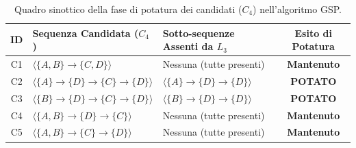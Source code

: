 \begin{table}[H]
\centering
\caption{Quadro sinottico della fase di potatura dei candidati ($C_4$) nell'algoritmo GSP.}
\label{tab:dm-gsp-pruning-summary}
\begin{tabularx}{\textwidth}{c l Y c}
\toprule
\textbf{ID} & \textbf{Sequenza Candidata ($C_4$)} & \textbf{Sotto-sequenze Assenti da $L_3$} & \textbf{Esito di Potatura} \\
\midrule
C1 & $\langle \{A, B\} \to \{C, D\} \rangle$                & Nessuna (tutte presenti) & \textbf{Mantenuto} \\
C2 & $\langle \{A\} \to \{D\} \to \{C\} \to \{D\} \rangle$  & $\langle \{A\} \to \{D\} \to \{D\} \rangle$ & \textbf{POTATO} \\
C3 & $\langle \{B\} \to \{D\} \to \{C\} \to \{D\} \rangle$  & $\langle \{B\} \to \{D\} \to \{D\} \rangle$ & \textbf{POTATO} \\
C4 & $\langle \{A, B\} \to \{D\} \to \{C\} \rangle$         & Nessuna (tutte presenti) & \textbf{Mantenuto} \\
C5 & $\langle \{A, B\} \to \{C\} \to \{D\} \rangle$         & Nessuna (tutte presenti) & \textbf{Mantenuto} \\
\bottomrule
\end{tabularx}
\end{table}
